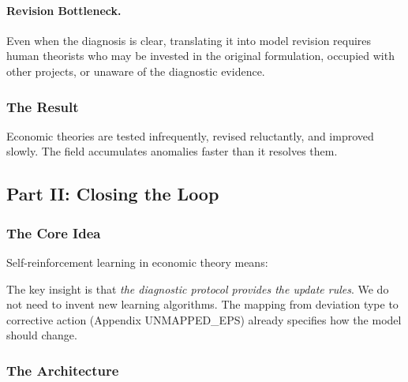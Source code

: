 \paragraph{Revision Bottleneck.}
Even when the diagnosis is clear, translating it into model revision requires 
human theorists who may be invested in the original formulation, occupied with 
other projects, or unaware of the diagnostic evidence.

\subsubsection{The Result}

Economic theories are tested infrequently, revised reluctantly, and improved 
slowly. The field accumulates anomalies faster than it resolves them.

\subsection{Part II: Closing the Loop}

\subsubsection{The Core Idea}

Self-reinforcement learning in economic theory means:

\begin{center}
\end{center}

The key insight is that \emph{the diagnostic protocol provides the update rules}. 
We do not need to invent new learning algorithms. The mapping from deviation 
type to corrective action (Appendix UNMAPPED_EPS) already specifies how the model should 
change.

\subsubsection{The Architecture}

